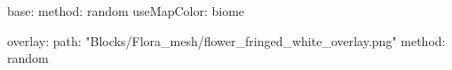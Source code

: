base:
  method: random
  useMapColor: biome
  
overlay:
  path: "Blocks/Flora_mesh/flower_fringed_white_overlay.png"
  method: random